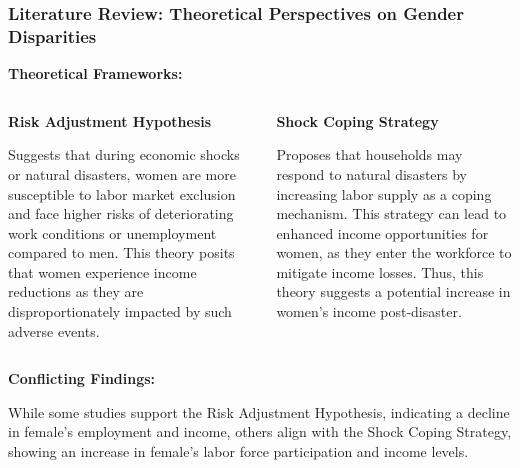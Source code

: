 \documentclass[serif, aspectratio=169]{beamer}
\newcommand{\returnbutton}[2]{%
  \vspace{-1.0cm}  %
  \hfill  %
  \hyperlink{#1}{%
    {\footnotesize\beamerbutton{#2}}%
  }%
  \vspace{0.3cm}  %
}
\begin{document}
\begin{frame}[label=theoretical_perspective]
\frametitle{Literature Review: Theoretical Perspectives on Gender Disparities}

\vspace{0.2cm}

\returnbutton{literature_review2}{Return}

    \textbf{Theoretical Frameworks:}
    
    \vspace{0.1cm}
    
    \begin{columns}[T] %
        \begin{column}{0.48\textwidth}
            \textbf{Risk Adjustment Hypothesis}
            
            \vspace{0.1cm}
            
            Suggests that during economic shocks or natural disasters, women are more susceptible to labor market exclusion and face higher risks of deteriorating work conditions or unemployment compared to men. This theory posits that women experience income reductions as they are disproportionately impacted by such adverse events.
        \end{column}
        \hfill
        \begin{column}{0.48\textwidth}
            \textbf{Shock Coping Strategy}
            
            \vspace{0.1cm}
            
            Proposes that households may respond to natural disasters by increasing labor supply as a coping mechanism. This strategy can lead to enhanced income opportunities for women, as they enter the workforce to mitigate income losses. Thus, this theory suggests a potential increase in women's income post-disaster.
        \end{column}
    \end{columns}
    
    \vspace{0.3cm}
    
    \textbf{Conflicting Findings:}
    
    While some studies support the Risk Adjustment Hypothesis, indicating a decline in female's employment and income, others align with the Shock Coping Strategy, showing an increase in female's labor force participation and income levels.

\end{frame}
\end{document}
